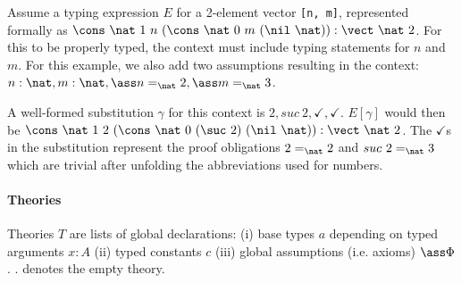 \begin{example}\label{ex:term}
  Assume a typing expression \(E\) for a 2-element vector \texttt{[n, m]}, represented formally as
    \(\cons\ \nat\ 1\ n\ (\cons\ \nat\ 0\ m\ (\nil\ \nat)):\vect\ \nat\ 2\). 
  For this to be properly typed, the
  context must include typing statements for \(n\) and \(m\). For this example, we
  also add two assumptions resulting in the context: \(n:\nat, m:\nat, \ass n=_{\nat} 2,
  \ass m=_{\nat} 3\).
  
  A well-formed substitution \(\gamma\) for this context is \(2, suc\ 2,
  \checkmark, \checkmark\). \(E[\gamma]\) would then be \(\cons\ \nat\ 1\
  2\ (\cons\ \nat\ 0\ (\suc\ 2)\ (\nil\ \nat)):\vect\ \nat\ 2\). The \(\checkmark\)s in the
  substitution represent the proof obligations \(2=_{\nat} 2\) %
  and \(suc\ 2 =_{\nat} 3\) %
  which are trivial after unfolding the abbreviations used for numbers.
\end{example}

\paragraph*{Theories}
Theories $T$ are lists of global declarations: (i) base types $a$ depending on typed arguments
$x:A$ (ii) typed constants $c$ (iii) global assumptions (i.e. axioms) $\ass \Phi$.
$.$ denotes the empty theory.

